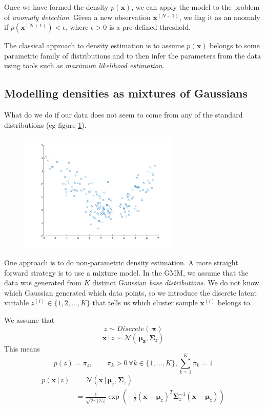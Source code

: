 \documentclass[final,3p,times,twocolumn]{elsarticle}
\begin{document}
Once we have formed the density $p(\boldsymbol x)$, we can apply the model to the problem of \emph{anomaly detection}.
Given a new observation $\boldsymbol x^{(N+1)}$, we flag it as an anomaly if $p(\boldsymbol x^{(N+1)}) < \epsilon$, where $\epsilon > 0$ is a pre-defined threshold.

The classical approach to density estimation is to assume $p(\boldsymbol x)$ belongs to some parametric family of distributions and to then infer the parameters from the data using tools such as \emph{maximum likelihood estimation}. 

\subsection{Modelling densities as mixtures of Gaussians}

What do we do if our data does not seem to come from any of the standard distributions (eg figure \ref{fig:gmm1}).
\begin{figure}
\centering
\includegraphics[width=3in]{gmm1.png}
\label{fig:gmm1}
\end{figure}
One approach is to do non-parametric density estimation. A more straight forward strategy is to use a mixture model.
In the GMM, we assume that the data was generated from $K$ distinct Gaussian \emph{base distributions}. 
We do not know which Gaussian generated which data points, so we introduce the discrete latent variable $z^{(i)} \in \{1,2,\dots,K\}$ that tells us which cluster sample $\boldsymbol x^{(i)}$ belongs to.

We assume that 
\begin{equation}
z \sim Discrete(\,\boldsymbol \pi)
\label{eqnzdistro}
\end{equation}
\begin{equation}
\boldsymbol x \,|\, z \sim \mathcal{N}(\,\boldsymbol{\mu_z}, \boldsymbol \Sigma_z)
\label{eqn:x|z-distro}
\end{equation}
This means
\begin{equation}
p(z) = \pi_z, \qquad \pi_k > 0 \, \forall k \in \{1,\dots,K\}, \sum_{k=1}^K \pi_k = 1 
\end{equation}
\begin{equation}
\begin{split}
p(\boldsymbol x\,|\,z) &= \mathcal{N}(\boldsymbol x\,|\, \boldsymbol \mu_z, \boldsymbol \Sigma_z) \\
&= \frac{1}{\sqrt{2\pi\,|\Sigma_z|}}\exp(-\frac{1}{2}(\boldsymbol x - \boldsymbol \mu_z)^T\boldsymbol \Sigma_z^{-1} (\boldsymbol x - \boldsymbol \mu_z))\\
\end{split}
\end{equation}
\end{document}
